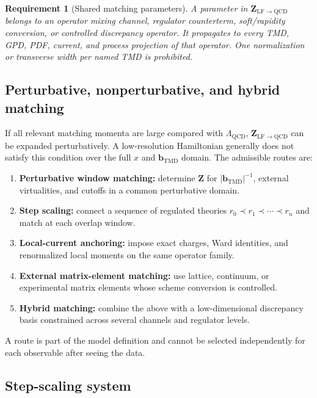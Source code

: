 \documentclass[11pt]{article}
\newtheorem{requirement}[definition]{Requirement}
\newcommand{\bM}{\bm{b}_{\mathrm{TMD}}}
\newcommand{\LF}{\mathrm{LF}}
\newcommand{\QCD}{\mathrm{QCD}}
\newcommand{\abs}[1]{\left|#1\right|}
\begin{document}
\begin{requirement}[Shared matching parameters]
A parameter in \(\bm Z_{\LF\to\QCD}\) belongs to an operator mixing channel,
regulator counterterm, soft/rapidity conversion, or controlled discrepancy
operator.  It propagates to every TMD, GPD, PDF, current, and process
projection of that operator.  One normalization or transverse width per named
TMD is prohibited.
\end{requirement}

\subsection{Perturbative, nonperturbative, and hybrid matching}

If all relevant matching momenta are large compared with \(\Lambda_{\QCD}\),
\(\bm Z_{\LF\to\QCD}\) can be expanded perturbatively.  A low-resolution
Hamiltonian generally does not satisfy this condition over the full \(x\) and
\(\bM\) domain.  The admissible routes are:
\begin{enumerate}
\item \textbf{Perturbative window matching:} determine \(\bm Z\) for
      \(\abs{\bM}^{-1}\), external virtualities, and cutoffs in a common
      perturbative domain.
\item \textbf{Step scaling:} connect a sequence of regulated theories
      \(r_0\prec r_1\prec\cdots\prec r_n\) and match at each overlap window.
\item \textbf{Local-current anchoring:} impose exact charges, Ward identities,
      and renormalized local moments on the same operator family.
\item \textbf{External matrix-element matching:} use lattice, continuum, or
      experimental matrix elements whose scheme conversion is controlled.
\item \textbf{Hybrid matching:} combine the above with a low-dimensional
      discrepancy basis constrained across several channels and regulator
      levels.
\end{enumerate}
A route is part of the model definition and cannot be selected independently
for each observable after seeing the data.

\subsection{Step-scaling system}
\end{document}
